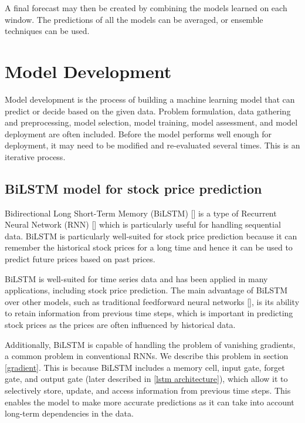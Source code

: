 \documentclass[a4paper]{article}
\begin{document}
A final forecast may then be created by combining the models learned on each window. The predictions of all the models can be averaged, or ensemble techniques can be used.
\section{Model Development}

Model development is the process of building a machine learning model that can predict or decide based on the given data. Problem formulation, data gathering and preprocessing, model selection, model training, model assessment, and model deployment are often included. Before the model performs well enough for deployment, it may need to be modified and re-evaluated several times. This is an iterative process.
\subsection{BiLSTM model for stock price prediction}
Bidirectional Long Short-Term Memory (BiLSTM) [\cite{schuster1997bidirectional}] is a type of Recurrent Neural Network (RNN) [\cite{rumelhart1985learning, jordan1997serial}] which is particularly useful for handling sequential data. BiLSTM is particularly well-suited for stock price prediction because it can remember the historical stock prices for a long time and hence it can be used to predict future prices based on past prices.

BiLSTM is well-suited for time series data and has been applied in many applications, including stock price prediction. The main advantage of BiLSTM over other models, such as traditional feedforward neural networks [\cite{rosenblatt1958perceptron}], is its ability to retain information from previous time steps, which is important in predicting stock prices as the prices are often influenced by historical data.

Additionally, BiLSTM is capable of handling the problem of vanishing gradients, a common problem in conventional RNNs. We describe this problem in section \ref{gradient}. This is because BiLSTM includes a memory cell, input gate, forget gate, and output gate (later described in \ref{lstm architecture}), which allow it to selectively store, update, and access information from previous time steps. This enables the model to make more accurate predictions as it can take into account long-term dependencies in the data.
\end{document}
